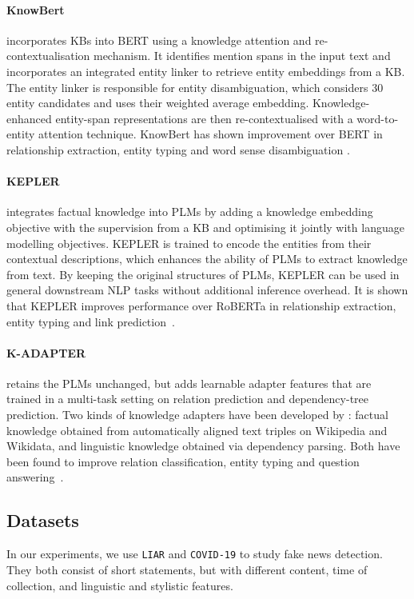\documentclass[letterpaper]{article} %
\begin{document}
\paragraph{KnowBert} incorporates KBs into BERT using a knowledge attention and re-contextualisation mechanism.
It identifies mention spans in the input text and incorporates an integrated entity linker to retrieve entity embeddings from a KB. 
The entity linker is responsible for entity disambiguation, which considers 30 entity candidates and uses their weighted average embedding. 
Knowledge-enhanced entity-span representations are then re-contextualised with a word-to-entity attention technique. 
KnowBert has shown improvement over BERT in relationship extraction, entity typing and word sense disambiguation \cite{peters-etal-2019-knowledge}.

\paragraph{KEPLER} integrates factual knowledge into PLMs by adding a knowledge embedding objective with the supervision from a KB and optimising it jointly with language modelling objectives.
KEPLER is trained to encode the entities from their contextual descriptions, which enhances the ability of PLMs to extract knowledge from text.
By keeping the original structures of PLMs, KEPLER can be used in general downstream NLP tasks without additional inference overhead.
It is shown that KEPLER improves performance over RoBERTa \cite{Liu2019RoBERTaAR} in relationship extraction, entity typing and link prediction~\cite{kepler}. 

\paragraph{K-ADAPTER} retains the PLMs unchanged, 
but adds learnable adapter features that are trained in a multi-task setting on relation prediction and dependency-tree prediction. 
Two kinds of knowledge adapters have been developed by \citet{wang-etal-2021-k}: factual knowledge obtained from automatically aligned text triples on Wikipedia and Wikidata, and linguistic knowledge obtained via dependency parsing. 
Both have been found to improve relation classification, entity typing and question answering~\cite{wang-etal-2021-k}.

\subsection{Datasets}
In our experiments, we use \texttt{LIAR} and \texttt{COVID-19} to study fake news detection.
They both consist of short statements, but with different content, time of collection, and linguistic and stylistic features. 
\end{document}
